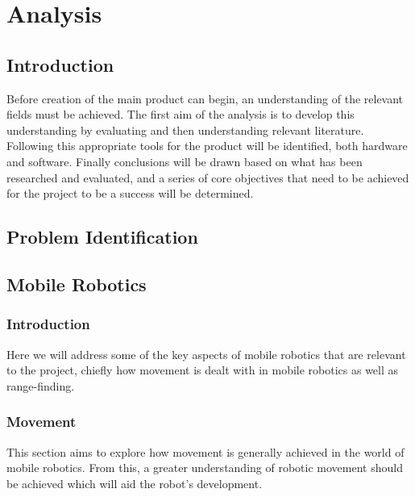 \part{Analysis}
		\chapter{Introduction}
		Before creation of the main product can begin, an understanding of the relevant fields must be achieved. The first aim of the analysis is to develop this understanding by evaluating and then understanding relevant literature. Following this appropriate tools for the product will be identified, both hardware and software. Finally conclusions will be drawn based on what has been researched and evaluated, and a series of core objectives that need to be achieved for the project to be a success will be determined.
		
		\chapter{Problem Identification}
		
		\chapter{Mobile Robotics}
			\section{Introduction}
			Here we will address some of the key aspects of mobile robotics that are relevant to the project, chiefly how movement is dealt with in mobile robotics as well as range-finding.
			
			\section{Movement}
			This section aims to explore how movement is generally achieved in the world of mobile robotics. From this, a greater understanding of robotic movement should be achieved which will aid the robot's development.
			
